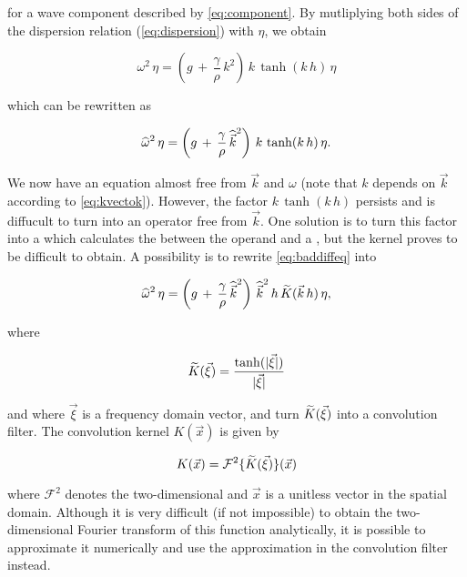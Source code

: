 for a wave component described by \eqref{eq:component}. By mutliplying both sides of the dispersion relation (\eqref{eq:dispersion}) with $\eta$, we obtain

\begin{equation}
\omega^2\,\eta = \left(g\,+\,\frac{\gamma}{\rho}\,k^2\right)\,k\,\tanh(k\,h)\,\eta
\end{equation}

which can be rewritten as

\begin{equation} \label{eq:baddiffeq}
\widehat{\omega}^2\,\eta = \left(g\,+\,\frac{\gamma}{\rho}\,{\widehat{\vec{k}}}^2\right)\,k\,\tanh(k\,h)\,\eta.
\end{equation}

We now have an equation almost free from $\vec{k}$ and $\omega$ (note that $k$ depends on $\vec{k}$ according to \eqref{eq:kvectok}). However, the factor $k\,\tanh(k\,h)$ persists and is diffucult to turn into an operator free from $\vec{k}$. One solution is to turn this factor into a  which calculates the  between the operand and a , but the kernel proves to be difficult to obtain. A possibility is to rewrite \eqref{eq:baddiffeq} into

\begin{equation} \label{eq:betterdiffeq}
\widehat{\omega}^2\,\eta = \left(g\,+\,\frac{\gamma}{\rho}\,{\widehat{\vec{k}}}^2\right)\,{\widehat{\vec{k}}}^2\,h\,\widetilde{K}(\vec{k}\,h)\,\eta,
\end{equation}

where

\begin{equation} %
\fdfunc{K}(\vec{\xi}) = \frac{\tanh(|\vec{\xi}|)}{|\vec{\xi}|}
\end{equation}

and where $\vec{\xi}$ is a  frequency domain vector, and turn $\widetilde{K}(\vec{\xi})$ into a convolution filter. The convolution kernel $K(\vec{x})$ is given by

\begin{equation} \label{eq:kernelfour2d}
K(\vec{x}) = \mathcal{F}^2\{\widetilde{K}(\vec{\xi})\}(\vec{x})
\end{equation}

where $\mathcal{F}^2$ denotes the two-dimensional  and $\vec{x}$ is a unitless vector in the spatial domain. Although it is very difficult (if not impossible) to obtain the two-dimensional Fourier transform of this function analytically, it is possible to approximate it numerically and use the approximation in the convolution filter instead.

